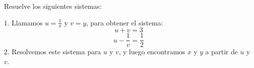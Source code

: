 \documentclass[spanish, 11pt]{exam}
\begin{document}
\begin{questions}
\question Resuelve los siguientes sistemas:





\begin{solution}
1. Llamamos \(u = \frac{1}{x}\) y \(v = y\), para obtener el sistema:
   \[
   u + v = 3
   \]
   \[
   u - \frac{1}{v} = \frac{1}{2}
   \]
2. Resolvemos este sistema para \(u\) y \(v\), y luego encontramos \(x\) y \(y\) a partir de \(u\) y \(v\).
\end{solution}


\end{questions}
\end{document}
